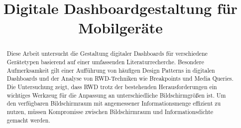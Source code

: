 \documentclass[conference,compsoc,final,a4paper]{IEEEtran}
\newcommand{\autoren}[0]{Wittmann, Yan}
\newcommand{\dokumententitel}[0]{Digitale Dashboardgestaltung für Mobilgeräte}
\begin{document}
    \title{\dokumententitel}

    \author{
        \IEEEauthorblockN{\autoren}
    }

    \maketitle
    \thispagestyle{plain}
    \pagestyle{plain}


    \begin{abstract}

        Diese Arbeit untersucht die Gestaltung digitaler Dashboards für verschiedene Gerätetypen basierend auf einer umfassenden Literaturrecherche.
        Besondere Aufmerksamkeit gilt einer Aufführung von häufigen Design Patterns in digitalen Dashboards und der Analyse von \acs{RWD}-Techniken wie Breakpoints und Media Queries.
        Die Untersuchung zeigt, dass \acs{RWD} trotz der bestehenden Herausforderungen ein wichtiges Werkzeug für die Anpassung an unterschiedliche Bildschirmgrößen ist.
        Um den verfügbaren Bildschirmraum mit angemessener Informationsmenge effizient zu nutzen, müssen Kompromisse zwischen Bildschirmraum und Informationsdichte gemacht werden.

    \end{abstract}

    \small\tableofcontents

\end{document}
